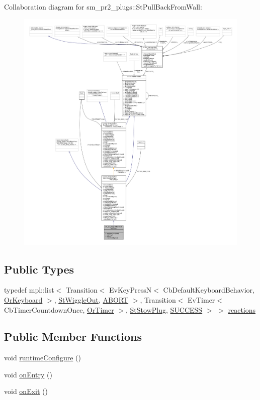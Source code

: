Collaboration diagram for sm\+\_\+pr2\+\_\+plugs\+:\+:St\+Pull\+Back\+From\+Wall\+:
\nopagebreak
\begin{figure}[H]
\begin{center}
\leavevmode
\includegraphics[width=350pt]{structsm__pr2__plugs_1_1StPullBackFromWall__coll__graph}
\end{center}
\end{figure}
\subsection*{Public Types}
\begin{DoxyCompactItemize}
\item 
typedef mpl\+::list$<$ Transition$<$ Ev\+Key\+PressN$<$ Cb\+Default\+Keyboard\+Behavior, \hyperlink{classsm__pr2__plugs_1_1OrKeyboard}{Or\+Keyboard} $>$, \hyperlink{structsm__pr2__plugs_1_1StWiggleOut}{St\+Wiggle\+Out}, \hyperlink{classABORT}{A\+B\+O\+RT} $>$, Transition$<$ Ev\+Timer$<$ Cb\+Timer\+Countdown\+Once, \hyperlink{classsm__pr2__plugs_1_1OrTimer}{Or\+Timer} $>$, \hyperlink{structsm__pr2__plugs_1_1StStowPlug}{St\+Stow\+Plug}, \hyperlink{classSUCCESS}{S\+U\+C\+C\+E\+SS} $>$ $>$ \hyperlink{structsm__pr2__plugs_1_1StPullBackFromWall_ae98bee2aa33bf23dc67a168be155e495}{reactions}
\end{DoxyCompactItemize}
\subsection*{Public Member Functions}
\begin{DoxyCompactItemize}
\item 
void \hyperlink{structsm__pr2__plugs_1_1StPullBackFromWall_a1be08c0cdc17a5c038cd8549118f98a6}{runtime\+Configure} ()
\item 
void \hyperlink{structsm__pr2__plugs_1_1StPullBackFromWall_ab57f9482de1c267f98eaf18ec6815bc9}{on\+Entry} ()
\item 
void \hyperlink{structsm__pr2__plugs_1_1StPullBackFromWall_ad07953a4adeb766a1415834772344f45}{on\+Exit} ()
\end{DoxyCompactItemize}
